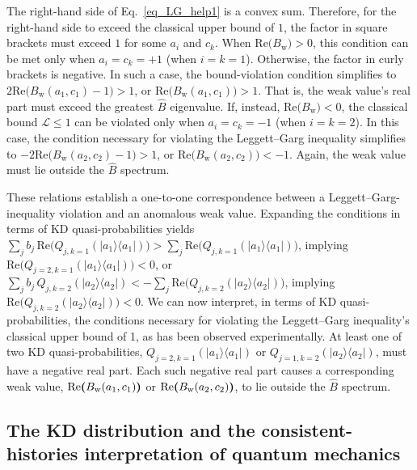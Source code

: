 \documentclass[%
 reprint,
superscriptaddress,
nofootinbib,
bibnotes,
 amsmath,amssymb,
 aps,
]{revtex4-1}
\theoremstyle{plain}
\newcommand*{\ketbra}[2]{\lvert #1 \rangle\!\langle #2 \rvert}
\newcommand{\LParen}{ \bm{(} }
\newcommand{\RParen}{ \bm{)} }
\begin{document}
The right-hand side of Eq.~\eqref{eq_LG_help1} is a convex sum. Therefore, for the right-hand side
to exceed  the classical upper bound of $1$, the factor in square brackets must exceed $1$ for some $a_i$ and $c_k$. 
When $\text{Re} \LParen B_{\mathrm{w}} \RParen > 0$, this condition can  be met only when $a_i = c_k = +1$ (when $i=k=1$). Otherwise, the factor in curly brackets 
is negative. In such a case, the bound-violation condition simplifies to $2\text{Re} \LParen B_{\mathrm{w}}(a_1,c_1) - 1 \RParen > 1$, or $\text{Re} \LParen B_{\mathrm{w}}(a_1,c_1) \RParen > 1$. That is, the weak value's real part must exceed the greatest $\hat{B}$ eigenvalue.  
If, instead, $\text{Re} \LParen B_{\mathrm{w}} \RParen < 0$, the classical bound $\mathcal{L} \leq 1$ can be violated 
only when $a_i = c_k = -1$  (when $i=k=2$). In this case, the condition necessary for violating the Leggett–Garg inequality simplifies to $-2\text{Re} \LParen B_{\mathrm{w}}(a_2,c_2)-1 \RParen > 1$, or $\text{Re} \LParen B_{\mathrm{w}}(a_2,c_2) \RParen< -1$.
Again, the weak value must lie outside the $\hat{B}$ spectrum.



These relations establish  a one-to-one correspondence between a Leggett--Garg-inequality violation and an anomalous weak value. Expanding the conditions in terms of KD quasi-probabilities yields 
$\sum_j b_j \,\text{Re} \LParen Q_{j,k=1} (\ketbra{a_1}{a_1}) \RParen
>  \sum_j\text{Re} \LParen Q_{j,k=1}(\ketbra{a_1}{a_1}) \RParen$, implying 
$\text{Re} \LParen Q_{j=2,k=1}(\ketbra{a_1}{a_1}) \RParen < 0$, or 
$\sum_j b_j\,Q_{j,k=2}(\ketbra{a_2}{a_2})
  <-\sum_j\text{Re} \LParen Q_{j,k=2}(\ketbra{a_2}{a_2}) \RParen$, implying 
  $\text{Re} \LParen Q_{j,k=2}(\ketbra{a_2}{a_2}) \RParen  <  0$. 
We can now interpret, in terms of KD quasi-probabilities, the conditions necessary for violating the Leggett--Garg inequality's classical upper bound of 1, as has been observed experimentally.
At least one of two  KD quasi-probabilities, $Q_{j=2,k=1}(\ketbra{a_1}{a_1})$ or $Q_{j=1,k=2}(\ketbra{a_2}{a_2})$, must  have a negative real part. 
Each such negative real part causes a corresponding weak value, 
${\rm Re} \LParen B_{\mathrm{w}}(a_1,c_1) \RParen$ or 
${\rm Re} \LParen B_{\mathrm{w}}(a_2,c_2) \RParen$, to lie outside the $\hat{B}$ spectrum.




\subsection{The KD distribution and the consistent-histories interpretation of quantum mechanics}
\label{SubSec:Consistent}
\end{document}
